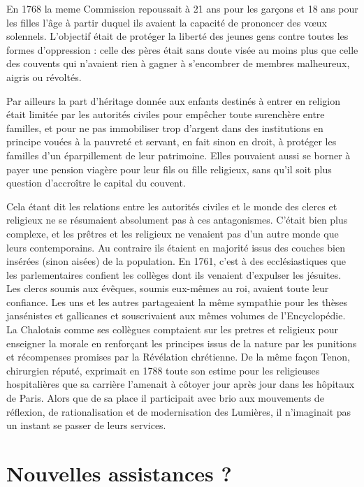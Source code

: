  En 1768 la meme Commission repoussait à 21 ans pour les garçons et 18 ans pour les filles l'âge à partir duquel ils avaient la capacité de prononcer des vœux solennels. L'objectif était de protéger la liberté des jeunes gens contre toutes les formes d'oppression : celle des pères était sans doute visée au moins plus que celle des couvents qui n'avaient rien à gagner à s'encombrer de membres malheureux, aigris ou révoltés.

 Par ailleurs la part d'héritage donnée aux enfants destinés à entrer en religion était limitée par les autorités civiles pour empêcher toute surenchère entre familles, et pour ne pas immobiliser trop d'argent dans des institutions en principe vouées à la pauvreté et servant, en fait sinon en droit, à protéger les familles d'un éparpillement de leur patrimoine. Elles pouvaient aussi se borner à payer une pension viagère pour leur fils ou fille religieux, sans qu'il soit plus question d'accroître le capital du couvent.

 Cela étant dit les relations entre les autorités civiles et le monde des clercs et religieux ne se résumaient absolument pas à ces antagonismes. C'était bien plus complexe, et les prêtres et les religieux ne venaient pas d'un autre monde que leurs contemporains. Au contraire ils étaient en majorité issus des couches bien insérées (sinon aisées) de la population. En 1761, c'est à des ecclésiastiques que les parlementaires confient les collèges dont ils venaient d'expulser les jésuites. Les clercs soumis aux évêques, soumis eux-mêmes au roi, avaient toute leur confiance. Les uns et les autres partageaient la même sympathie pour les thèses jansénistes et gallicanes et souscrivaient aux mêmes volumes de l'Encyclopédie. La Chalotais comme ses collègues comptaient sur les pretres et religieux pour enseigner la morale en renforçant les principes issus de la nature par les punitions et récompenses promises par la Révélation chrétienne. De la même façon Tenon, chirurgien réputé, exprimait en 1788 toute son estime pour les religieuses hospitalières que sa carrière l'amenait à côtoyer jour après jour dans les hôpitaux de Paris. Alors que de sa place il participait avec brio  aux mouvements de réflexion, de rationalisation et de modernisation des Lumières, il n'imaginait pas un instant se passer de leurs services. 


\section{Nouvelles assistances ?}


